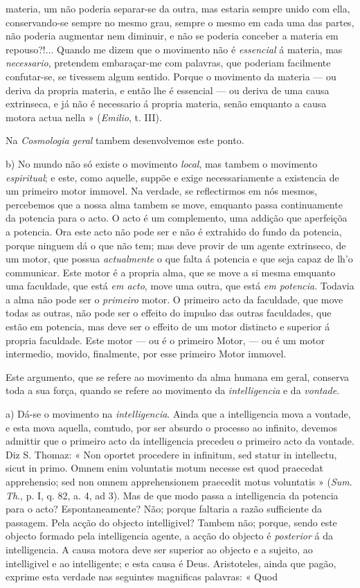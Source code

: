 materia, um não poderia separar-se da outra, mas estaria sempre unido com ella, conservando-se sempre no mesmo grau, sempre o mesmo em cada uma das partes, não poderia augmentar nem diminuir, e não se poderia conceber a materia em repouso?!... Quando me dizem que o movimento não é \emph{essencial} á materia, mas \emph{necessario}, pretendem embaraçar-me com palavras, que poderiam facilmente confutar-se, se tivessem algum sentido. Porque o movimento da materia --- ou deriva da propria materia, e então lhe é essencial --- ou deriva de uma causa extrinseca, e já não é necessario á propria materia, senão emquanto a causa motora actua nella » (\emph{Emilio}, t. III).\par Na \emph{Cosmologia geral} tambem desenvolvemos este ponto.\par b) No mundo não só existe o movimento \emph{local}, mas tambem o movimento \emph{espiritual}; e este, como aquelle, suppõe e exige necessariamente a existencia de um primeiro motor immovel. Na verdade, se reflectirmos em nós mesmos, percebemos que a nossa alma tambem se move, emquanto passa continuamente da potencia para o acto. O acto é um complemento, uma addição que aperfeiçõa a potencia. Ora este acto não pode ser e não é extrahido do fundo da potencia, porque ninguem dá o que não tem; mas deve provir de um agente extrinseco, de um motor, que possua \emph{actualmente} o que falta á potencia e que seja capaz de lh'o communicar. Este motor é a propria alma, que se move a si mesma emquanto uma faculdade, que está \emph{em acto}, move uma outra, que está \emph{em potencia}. Todavia a alma não pode ser o \emph{primeiro} motor. O primeiro acto da faculdade, que move todas as outras, não pode ser o effeito do impulso das outras faculdades, que estão em potencia, mas deve ser o effeito de um motor distincto e superior á propria faculdade. Este motor --- ou é o primeiro Motor, --- ou é um motor intermedio, movido, finalmente, por esse primeiro Motor immovel.\par Este argumento, que se refere ao movimento da alma humana em geral, conserva toda a sua força, quando se refere ao movimento da \emph{intelligencia} e da \emph{vontade}.\par a) Dá-se o movimento na \emph{intelligencia}. Ainda que a intelligencia mova a vontade, e esta mova aquella, comtudo, por ser absurdo o processo ao infinito, devemos admittir que o primeiro acto da intelligencia precedeu o primeiro acto da vontade. Diz S. Thomaz: « Non oportet procedere in infinitum, sed statur in intellectu, sicut in primo. Omnem enim voluntatis motum necesse est quod praecedat apprehensio; sed non omnem apprehensionem praecedit motus voluntatis » (\emph{Sum}. \emph{Th}., p. I, q. 82, a. 4, ad 3). Mas de que modo passa a intelligencia da potencia para o acto? Espontaneamente? Não; porque faltaria a razão sufficiente da passagem. Pela acção do objecto intelligivel? Tambem não; porque, sendo este objecto formado pela intelligencia agente, a acção do objecto é \emph{posterior} á da intelligencia. A causa motora deve ser superior ao objecto e a sujeito, ao intelligivel e ao intelligente; e esta causa é Deus. Aristoteles, ainda que pagão, exprime esta verdade nas seguintes magnificas palavras: « Quod 
